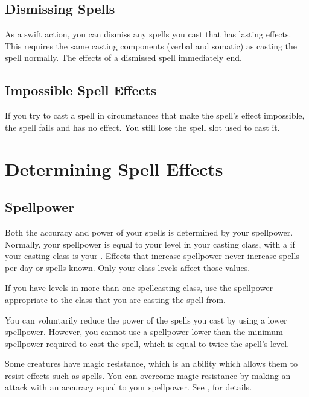     \subsection{Dismissing Spells}

        As a swift action, you can dismiss any spells you cast that has lasting effects. This requires the same casting components (verbal and somatic) as casting the spell normally. The effects of a dismissed spell immediately end.

    \subsection{Impossible Spell Effects}
        If you try to cast a spell in circumstances that make the spell's effect impossible, the spell fails and has no effect. You still lose the spell slot used to cast it.

\section{Determining Spell Effects}

    \subsection{Spellpower}

        Both the accuracy and power of your spells is determined by your spellpower.
        Normally, your spellpower is equal to your level in your casting class, with a  if your casting class is your .
        Effects that increase spellpower never increase spells per day or spells known. Only your class levels affect those values.

         If you have levels in more than one spellcasting class, use the spellpower appropriate to the class that you are casting the spell from.

         You can voluntarily reduce the power of the spells you cast by using a lower spellpower. However, you cannot use a spellpower lower than the minimum spellpower required to cast the spell, which is equal to twice the spell's level.

         Some creatures have magic resistance, which is an ability which allows them to resist  effects such as spells. You can overcome magic resistance by making an attack with an accuracy equal to your spellpower. See , for details.

